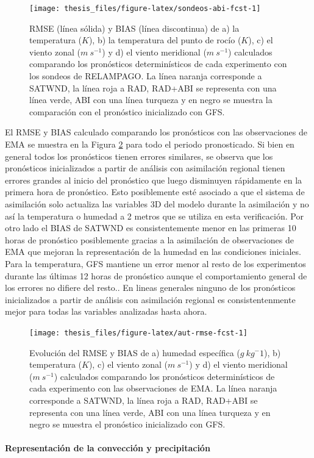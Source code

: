 \documentclass[12pt,oneside,a4paper]{reedthesis}
\begin{document}
\begin{figure}

{\centering \texttt{[image: thesis\_files/figure-latex/sondeos-abi-fcst-1]} 

}

\caption{RMSE (línea sólida) y BIAS (línea discontinua) de a) la temperatura (\(K\)), b) la temperatura del punto de rocío (\(K\)), c) el viento zonal (\(m\ s^{-1}\)) y d) el viento meridional (\(m\ s^{-1}\)) calculados comparando los pronósticos determinísticos de cada experimento con los sondeos de RELAMPAGO. La línea naranja corresponde a SATWND, la línea roja a RAD, RAD+ABI se representa con una línea verde, ABI con una línea turqueza y en negro se muestra la comparación con el pronóstico inicializado con GFS.}\label{fig:sondeos-abi-fcst}
\end{figure}
El RMSE y BIAS calculado comparando los pronósticos con las observaciones de EMA se muestra en la Figura \ref{fig:aut-rmse-fcst} para todo el periodo pronosticado. Si bien en general todos los pronósticos tienen errores similares, se observa que los pronósticos inicializados a partir de análisis con asimilación regional tienen errores grandes al inicio del pronóstico que luego disminuyen rápidamente en la primera hora de pronóstico. Esto posiblemente esté asociado a que el sistema de asimilación solo actualiza las variables 3D del modelo durante la asimilación y no así la temperatura o humedad a 2 metros que se utiliza en esta verificación. Por otro lado el BIAS de SATWND es consistentemente menor en las primeras 10 horas de pronóstico posiblemente gracias a la asimilación de observaciones de EMA que mejoran la representación de la humedad en las condiciones iniciales. Para la temperatura, GFS mantiene un error menor al resto de los experimentos durante las últimas 12 horas de pronóstico aunque el comportamiento general de los errores no difiere del resto.. En lineas generales ninguno de los pronósticos inicializados a partir de análisis con asimilación regional es consistentenmente mejor para todas las variables analizadas hasta ahora.


\begin{figure}

{\centering \texttt{[image: thesis\_files/figure-latex/aut-rmse-fcst-1]} 

}

\caption{Evolución del RMSE y BIAS de a) humedad específica (\(g\ kg{^-1}\)), b) temperatura (\(K\)), c) el viento zonal (\(m\ s^{-1}\)) y d) el viento meridional (\(m\ s^{-1}\)) calculados comparando los pronósticos determinísticos de cada experimento con las observaciones de EMA. La línea naranja corresponde a SATWND, la línea roja a RAD, RAD+ABI se representa con una línea verde, ABI con una línea turqueza y en negro se muestra el pronóstico inicializado con GFS.}\label{fig:aut-rmse-fcst}
\end{figure}
\hypertarget{representaciuxf3n-de-la-convecciuxf3n-y-precipitaciuxf3n}{%
\paragraph{Representación de la convección y precipitación}\label{representaciuxf3n-de-la-convecciuxf3n-y-precipitaciuxf3n}}
\end{document}
